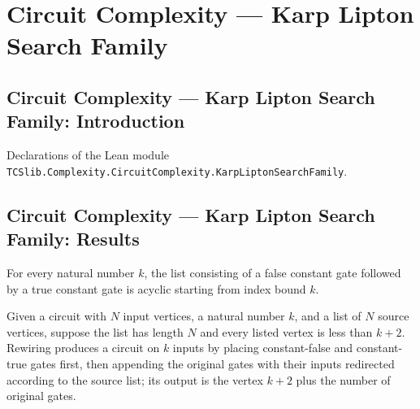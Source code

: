 \section{Circuit Complexity --- Karp Lipton Search Family}
\subsection*{Circuit Complexity --- Karp Lipton Search Family: Introduction}

Declarations of the Lean module \texttt{TCSlib.Complexity.CircuitComplexity.KarpLiptonSearchFamily}.

\subsection*{Circuit Complexity --- Karp Lipton Search Family: Results}

\begin{theorem}
\label{BoolCircuit.gatesAcyclic_consts}
\leanok
{}
For every natural number $k$, the list consisting of a false constant gate followed by a
true constant gate is acyclic starting from index bound $k$.
\end{theorem}

\begin{definition}
\label{BoolCircuit.DAGCircuit.rewire}
\leanok
{}
Given a circuit with $N$ input vertices, a natural number $k$, and a list of $N$ source
vertices, suppose the list has length $N$ and every listed vertex is less than $k+2$.
Rewiring produces a circuit on $k$ inputs by placing constant-false and constant-true
gates first, then appending the original gates with their inputs redirected according to
the source list; its output is the vertex $k+2$ plus the number of original gates.
\end{definition}

